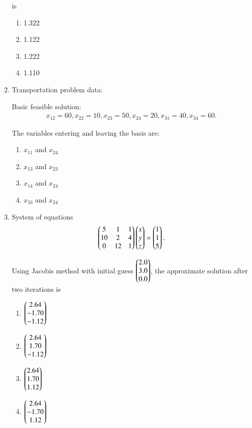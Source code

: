 \documentclass[journal]{IEEEtran}
\numberwithin{equation}{enumi}
\numberwithin{figure}{enumi}
\begin{document}
\begin{enumerate}
is
\hfill{}
\begin{multicols}{4}
\begin{enumerate}
\item 1.322
\item 1.122
\item 1.222
\item 1.110
\end{enumerate}
\end{multicols}

\item
Transportation problem data:




Basic feasible solution:
\begin{align}
    x_{12}=60, x_{22}=10, x_{23}=50, x_{24}=20, x_{31}=40, x_{34}=60.
\end{align}

The variables entering and leaving the basis are:
\hfill{}
\begin{multicols}{2}
\begin{enumerate}
\item $x_{11}$ and $x_{24}$
\item $x_{13}$ and $x_{23}$
\item $x_{14}$ and $x_{24}$
\item $x_{33}$ and $x_{24}$
\end{enumerate}
\end{multicols}

\item
System of equations
\begin{align}
    \begin{pmatrix}
5 & 1 & 1 \\
10 & 2 & 4 \\
0 & 12 & 1
\end{pmatrix}
\begin{pmatrix}x \\ y \\ z\end{pmatrix} =
\begin{pmatrix}1 \\ 1 \\ 5\end{pmatrix}.
\end{align}


Using Jacobis method with initial guess $\begin{pmatrix}2.0 \\ 3.0 \\ 0.0\end{pmatrix}$, the approximate solution after two iterations is
\hfill{}
\begin{multicols}{2}
\begin{enumerate}
\item $\begin{pmatrix}2.64 \\ -1.70 \\ -1.12\end{pmatrix}$
\item $\begin{pmatrix}2.64 \\ 1.70 \\ -1.12\end{pmatrix}$
\item $\begin{pmatrix}2.64 \\ 1.70 \\ 1.12\end{pmatrix}$
\item $\begin{pmatrix}2.64 \\ -1.70 \\ 1.12\end{pmatrix}$
\end{enumerate}
\end{multicols}


\end{enumerate}
\end{document}
